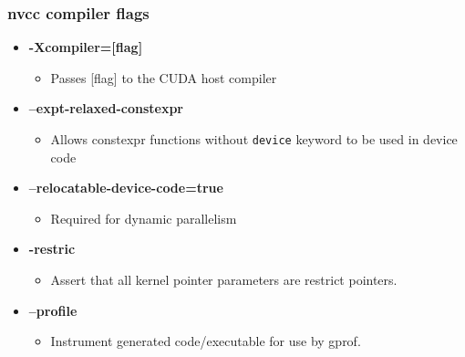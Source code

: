 \documentclass[aspectratio=169,handout]{beamer}
\begin{document}
\begin{frame}[fragile]
\frametitle{nvcc compiler flags}

\begin{itemize}
\item[] \textbf{-Xcompiler=[flag]}
\begin{itemize}
\item[] Passes [flag] to the CUDA host compiler
\end{itemize}

\item[] \textbf{--expt-relaxed-constexpr}
\begin{itemize}
\item[] Allows constexpr functions without \texttt{device} keyword to be used in device code
\end{itemize}

\item[] \textbf{--relocatable-device-code=true}
\begin{itemize}
\item[] Required for dynamic parallelism
\end{itemize}

\item[] \textbf{-restric}
\begin{itemize}
\item[] Assert that all kernel pointer parameters are restrict pointers.
\end{itemize}

\item[] \textbf{--profile}
\begin{itemize}
\item[] Instrument generated code/executable for use by gprof.
\end{itemize}


\end{itemize}
\end{frame}
\end{document}
